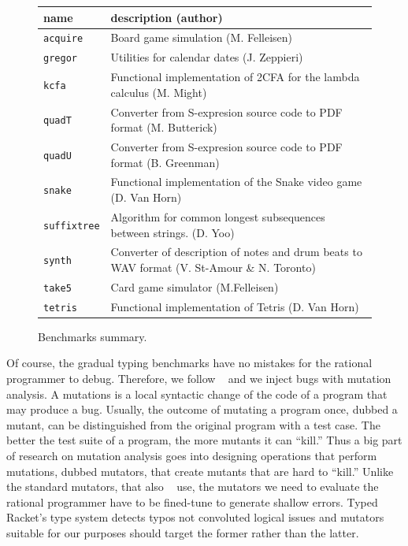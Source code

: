 \begin{figure}
\begin{tabular}{p{2cm} | p{10cm} }
  {\bf  name} & {\bf description (author)}  \\

\hline

  \texttt{acquire} & Board game simulation (M. Felleisen)  \\%


\hline
  \texttt{gregor} & Utilities for calendar dates (J. Zeppieri) \\%


\hline
  \texttt{kcfa} & Functional implementation of 2CFA for the lambda calculus (M. Might) \\%


\hline
  \texttt{quadT} & Converter from S-expresion source code to PDF format (M. Butterick)\\%
    
\hline
  \texttt{quadU} & Converter from S-expresion source code to PDF format  (B. Greenman) \\%

\hline
  \texttt{snake} & Functional implementation of the  Snake video game (D. Van Horn) \\%

\hline
  \texttt{suffixtree} & Algorithm for common longest subsequences between strings. (D. Yoo) \\%

\hline
  \texttt{synth} & Converter of description of notes and drum beats to WAV format (V. St-Amour \& N. Toronto) \\%

\hline
  \texttt{take5} & Card game simulator (M.Felleisen)  \\%

\hline
  \texttt{tetris} & Functional implementation of Tetris (D. Van Horn) \\%


\end{tabular}
  \caption{Benchmarks summary.}
  \label{table:benchmark-descriptions}
\end{figure}

Of course, the gradual typing benchmarks have no mistakes for the rational
programmer to debug. Therefore, we follow
~\cite{lksfd-popl-2020} and we inject bugs with mutation analysis. 
A mutations is a local syntactic change of the code of a program that may
produce a bug. Usually, the outcome of mutating a program
once, dubbed a mutant, can be distinguished from the original program with a test case. 
The better the test suite of a program, the more mutants it can ``kill.''
Thus a big part of research on mutation analysis goes into designing
operations that perform mutations, dubbed mutators, that create mutants 
that are hard to ``kill.'' Unlike the standard mutators, that also ~\cite{lksfd-popl-2020}
use, the mutators we need to evaluate the rational programmer have to be
fined-tune to generate shallow errors. Typed Racket's type system detects 
typos not convoluted logical issues and mutators suitable for our purposes
should target the former rather than the latter. 

